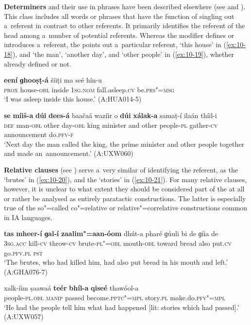 \textbf{Determiners} and their use in  phrases have been described elsewhere (see  and ). This class includes all words or phrases that have the function of singling out a~referent in contrast to other referents. It primarily identifies the referent of the  head among a~number of potential referents. Whereas the   modifier defines or introduces a~referent, the  points out a~particular referent, `this house' in (\ref{ex:10-18}), and `the man', `another day', and `other people' in (\ref{ex:10-19}), whether already defined or not.

\ea
\label{ex:10-18}
\gll \textbf{eení} \textbf{ɡhooṣṭ-á} šíiṭi ma seé hín-u\\
\textsc{prox} house-\textsc{obl} inside \textsc{1sg.nom} fall.asleep.\textsc{cv} be.\textsc{prs"=msg} \\
\glt `I was asleep inside this house.' (A:HUA014-5)

\ex
\label{ex:10-19}
\gll \textbf{se} \textbf{míiš-a} \textbf{dúi} \textbf{dees-á} baačaá wazíir o \textbf{dúi} \textbf{xálak-a} samaṭ-í ilaán thíil-i \\
\textsc{def} man-\textsc{obl} other day-\textsc{obl} king minister and other  people-\textsc{pl} gather-\textsc{cv} announcement do.\textsc{pfv-f}  \\
\glt `Next day the man called the king, the prime minister and other people together and made an~announcement.' (A:UXW060)
\z

\textbf{Relative clauses} (see ) serve a~very similar  of identifying the referent, as the `brutes' in (\ref{ex:10-20}), and the `stories' in (\ref{ex:10-21}). For many relative clauses, however, it is unclear to what extent they should be considered part of the   at all or rather be analysed as entirely paratactic constructions. The latter is especially true of the so"=called co"=relative or relative"=correlative constructions common in IA languages. 


\begin{exe}
\ex
\label{ex:10-20}
\gll \textbf{tas} \textbf{mheer-í} \textbf{ɡal-í} \textbf{zaalim"=aan-óom} dhút-a pharé ɡúuli bi de ɡíia de \\
\textsc{3sg.acc} kill-\textsc{cv} throw-\textsc{cv} brute-\textsc{pl"=obl} mouth-\textsc{obl} toward  bread also put.\textsc{cv} go.\textsc{pfv.pl} \textsc{pst} \\
\glt `The brutes, who had killed him, had also put bread in his mouth and left.' (A:GHA076-7)

\ex
\label{ex:10-21}
\gll xalk-íim ṣaawaá \textbf{teér} \textbf{bhíl-a} \textbf{qiseé} thawóol-a\\
people-\textsc{pl.obl} \textsc{manip} passed become.\textsc{pptc"=mpl} story.\textsc{pl} make.do.\textsc{pfv"=mpl}\\
\glt `He had the people tell him what had happened [lit: stories which had passed].' (A:UXW057)
\end{exe}


